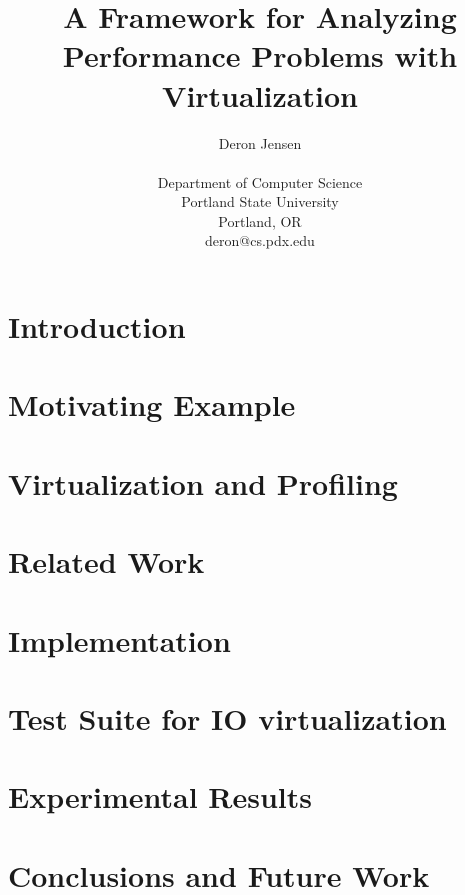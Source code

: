 \documentclass[10pt,twocolumn,oneside]{article}
\begin{document}
\title{A Framework for Analyzing Performance Problems with Virtualization}
\author{Deron Jensen\\
\\
Department of Computer Science\\
Portland State University\\
Portland, OR \\
deron@cs.pdx.edu \\
}

\maketitle

\begin{abstract}
\end{abstract}

\section{Introduction}


\section{Motivating Example}


\section{Virtualization and Profiling}


\section{Related Work}


\section{Implementation}


\section{Test Suite for IO virtualization}


\section{Experimental Results}


\section{Conclusions and Future Work}


\end{document}
